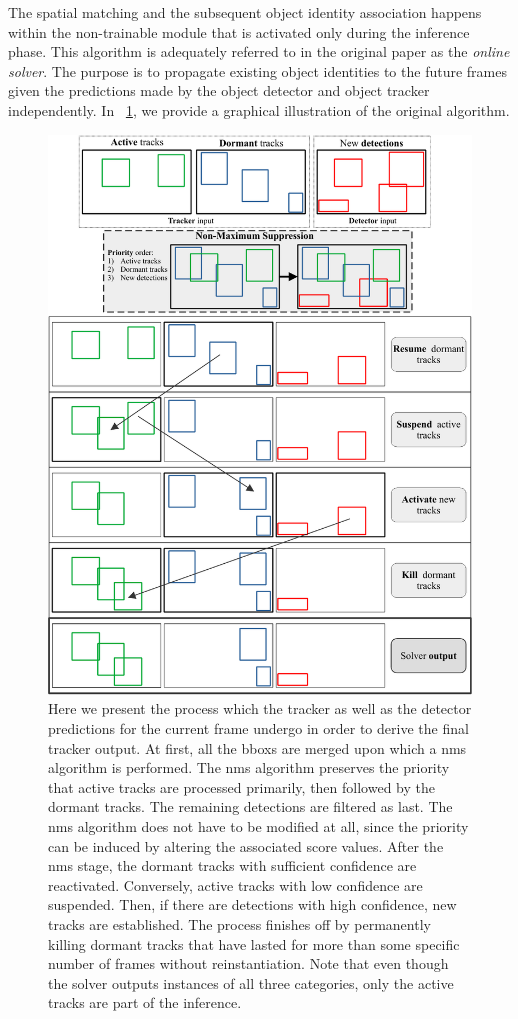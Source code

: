The spatial matching and the subsequent object identity association happens within the non-trainable module that is activated only during the inference phase. This algorithm is adequately referred to in the original paper as the \emph{online solver}. The purpose is to propagate existing object identities to the future frames given the predictions made by the object detector and object tracker independently. In \figtext{}~\ref{fig:SiamMOTOnlineSolver}, we provide a graphical illustration of the original algorithm.

\begin{figure}[!t]
    \centering
    \includegraphics[width=0.85\linewidth]{figures/siamese_tracking/siammot_online_solver.pdf}
    \caption[\siammot{} online solver]{Here we present the process which the tracker as well as the detector predictions for the current frame undergo in order to derive the final tracker output. At first, all the \glspl{bbox} are merged upon which a \gls{nms} algorithm is performed. The \gls{nms} algorithm preserves the priority that active tracks are processed primarily, then followed by the dormant tracks. The remaining detections are filtered as last. The \gls{nms} algorithm does not have to be modified at all, since the priority can be induced by altering the associated score values. After the \gls{nms} stage, the dormant tracks with sufficient confidence are reactivated. Conversely, active tracks with low confidence are suspended. Then, if there are detections with high confidence, new tracks are established. The process finishes off by permanently killing dormant tracks that have lasted for more than some specific number of frames without reinstantiation. Note that even though the solver outputs instances of all three categories, only the active tracks are part of the inference.}
    \label{fig:SiamMOTOnlineSolver}
\end{figure}
